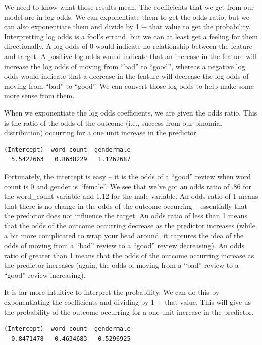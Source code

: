 \documentclass[
  letterpaper,
]{krantz}
\begin{document}
We need to know what those results mean. The coefficients that we get
from our model are in log odds. We can exponentiate them to get the odds
ratio, but we can also exponentiate them and divide by 1 + that value to
get the probability. Interpretting log odds is a fool's errand, but we
can at least get a feeling for them directionally. A log odds of 0 would
indicate no relationship between the feature and target. A positive log
odds would indicate that an increase in the feature will increase the
log odds of moving from ``bad'' to ``good'', whereas a negative log odds
would indicate that a decrease in the feature will decrease the log odds
of moving from ``bad'' to ``good''. We can convert those log odds to
help make some more sense from them.

When we exponentiate the log odds coefficients, we are given the odds
ratio. This is the ratio of the odds of the outcome (i.e., success from
our binomial distribution) occurring for a one unit increase in the
predictor.

\begin{verbatim}
(Intercept)  word_count  gendermale 
  5.5422663   0.8638229   1.1262687 
\end{verbatim}

Fortunately, the intercept is easy -- it is the odds of a ``good''
review when word count is 0 and gender is ``female''. We see that we've
got an odds ratio of .86 for the word\_count variable and 1.12 for the
male variable. An odds ratio of 1 means that there is no change in the
odds of the outcome occurring -- essentially that the predictor does not
influence the target. An odds ratio of less than 1 means that the odds
of the outcome occurring decrease as the predictor increases (while a
bit more complicated to wrap your head around, it captures the idea of
the odds of moving from a ``bad'' review to a ``good'' review
decreasing). An odds ratio of greater than 1 means that the odds of the
outcome occurring increase as the predictor increases (again, the odds
of moving from a ``bad'' review to a ``good'' review increasing).

It is far more intuitive to interpret the probability. We can do this by
exponentiating the coefficients and dividing by 1 + that value. This
will give us the probability of the outcome occurring for a one unit
increase in the predictor.

\begin{verbatim}
(Intercept)  word_count  gendermale 
  0.8471478   0.4634683   0.5296925 
\end{verbatim}
\end{document}
